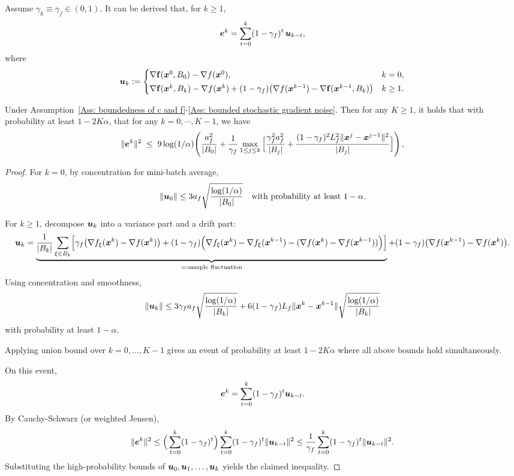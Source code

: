 \documentclass[10pt]{article}
\begin{document}
Assume \(\gamma_k \equiv \gamma_f \in (0,1)\). It can be derived that, for \(k \ge 1\),
\[
\bm{e}^k = \sum_{t=0}^{k}(1-\gamma_f)^t\,\bm{u}_{k-t},
\]
where
\begin{align}
\bm{u}_k :=
\begin{cases}
\nabla \mathbf f(\bm{x}^0,B_0) - \nabla f(\bm{x}^0), & k=0,\\[2pt]
\nabla \mathbf f(\bm{x}^k,B_k) - \nabla f(\bm{x}^k) 
+(1-\gamma_f)\!\left(\nabla f(\bm{x}^{k-1}) - \nabla \mathbf f(\bm{x}^{k-1},B_k) \right) & k\ge1.
\end{cases}
\end{align}

\begin{lemma}
    Under Assumption~\ref{Ass: boundedness of c and f}-\ref{Ass: bounded stochastic gradient noise}. 
    Then for any \( K \geq 1\), it holds that with probability at least $1-2K \alpha$, that for any
    $k = 0, \cdots, K-1$, we have 
    \begin{align*}
    \|\bm{e}^k\|^2
\;\le\;
9\log(1/\alpha)\!\left(
\frac{a_f^2}{|B_0|}
+\frac{1}{\gamma_f}\max_{1\le j\le k}
\Big[
\frac{\gamma_f^2 a_f^2}{|B_j|}
+\frac{(1-\gamma_f)^2L_f^2\|\bm{x}^j-\bm{x}^{j-1}\|^2}{|B_j|}
\Big]
\right),
    \end{align*}
\end{lemma}
\begin{proof}
For $k=0$, by concentration for mini-batch average,
\[
\|\bm{u}_0\|
\le 3a_f\sqrt{\frac{\log(1/\alpha)}{|B_0|}}
\quad\text{with probability at least }1-\alpha.
\]

For $k\ge 1$, decompose $\bm{u}_k$ into a variance part and a drift part:
\[
\bm{u}_k
=
\underbrace{
\frac{1}{|B_k|}\sum_{\xi\in B_k}
\!\left[
\gamma_f\big(\nabla f_\xi(\bm{x}^k)-\nabla f(\bm{x}^k)\big)
+(1-\gamma_f)\Big(
\nabla f_\xi(\bm{x}^k)-\nabla f_\xi(\bm{x}^{k-1})
-(\nabla f(\bm{x}^k)-\nabla f(\bm{x}^{k-1}))
\Big)
\right]}_{=: \text{sample fluctuation}}
+
(1-\gamma_f)\big(\nabla f(\bm{x}^{k-1})-\nabla f(\bm{x}^k)\big).
\]
Using concentration and smoothness,
\[
\|\bm{u}_k\|
\le
3\gamma_f a_f\sqrt{\frac{\log(1/\alpha)}{|B_k|}}
+
6(1-\gamma_f)L_f\|\bm{x}^k-\bm{x}^{k-1}\|
\sqrt{\frac{\log(1/\alpha)}{|B_k|}}
\]
with probability at least $1-\alpha$.

Applying union bound over $k=0,\ldots,K-1$ gives an event of probability
at least $1-2K\alpha$ where all above bounds hold simultaneously.

On this event,
\[
\bm{e}^k=\sum_{t=0}^k(1-\gamma_f)^t\bm{u}_{k-t}.
\]
By Cauchy-Schwarz (or weighted Jensen),
\[
\|\bm{e}^k\|^2
\le
\Big(\sum_{t=0}^k(1-\gamma_f)^t\Big)
\sum_{t=0}^k(1-\gamma_f)^t\|\bm{u}_{k-t}\|^2
\le
\frac{1}{\gamma_f}\sum_{t=0}^k(1-\gamma_f)^t\|\bm{u}_{k-t}\|^2.
\]
Substituting the high-probability bounds of $\bm{u}_0,\bm{u}_1,\ldots,\bm{u}_k$
yields the claimed inequality.
\end{proof}
\end{document}
